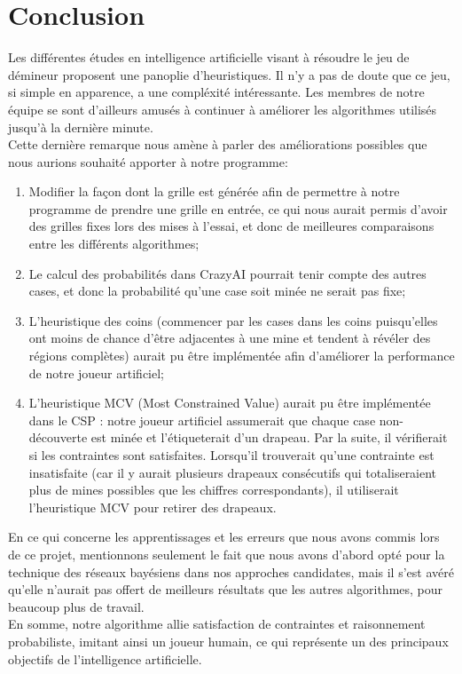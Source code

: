 \documentclass{article}
\begin{document}
\section{Conclusion}
Les différentes études en intelligence artificielle visant à résoudre le jeu de démineur 
proposent une panoplie d’heuristiques. Il n’y a pas de doute que ce jeu, si simple en apparence, 
a une compléxité intéressante. Les membres de notre équipe se sont d’ailleurs amusés à continuer 
à améliorer les algorithmes utilisés jusqu’à la dernière minute. \\

Cette dernière remarque nous amène à parler des améliorations possibles que nous aurions souhaité apporter à notre programme:
\begin{enumerate}
        \item Modifier la façon dont la grille est générée afin de permettre à notre programme 
              de prendre une grille en entrée, ce qui nous aurait permis d’avoir des grilles fixes 
              lors des mises à l’essai, et donc de meilleures comparaisons entre les différents algorithmes;
        \item Le calcul des probabilités dans CrazyAI pourrait tenir compte des autres cases, 
              et donc la probabilité qu’une case soit minée ne serait pas fixe;
        \item L’heuristique des coins (commencer par les cases dans les coins puisqu’elles ont 
              moins de chance d’être adjacentes à une mine et tendent à révéler des régions complètes) 
              aurait pu être implémentée afin d’améliorer la performance de notre joueur artificiel;
        \item L’heuristique MCV (Most Constrained Value) aurait pu être implémentée dans le CSP : notre joueur 
              artificiel assumerait que chaque case non-découverte est minée et l’étiqueterait d’un drapeau. 
              Par la suite, il vérifierait si les contraintes sont satisfaites. Lorsqu’il trouverait qu’une 
              contrainte est insatisfaite (car il y aurait plusieurs drapeaux consécutifs qui totaliseraient 
              plus de mines possibles que les chiffres correspondants), il utiliserait l’heuristique MCV pour retirer des drapeaux.
\end{enumerate}

En ce qui concerne les apprentissages et les erreurs que nous avons commis lors de ce 
projet, mentionnons seulement le fait que nous avons d’abord opté pour la technique des 
réseaux bayésiens dans nos approches candidates, mais il s’est avéré qu’elle n’aurait pas
offert de meilleurs résultats que les autres algorithmes, pour beaucoup plus de travail. \\

En somme, notre algorithme allie satisfaction de contraintes et raisonnement probabiliste, imitant ainsi un joueur 
humain, ce qui représente un des principaux objectifs de l'intelligence artificielle.
\end{document}
